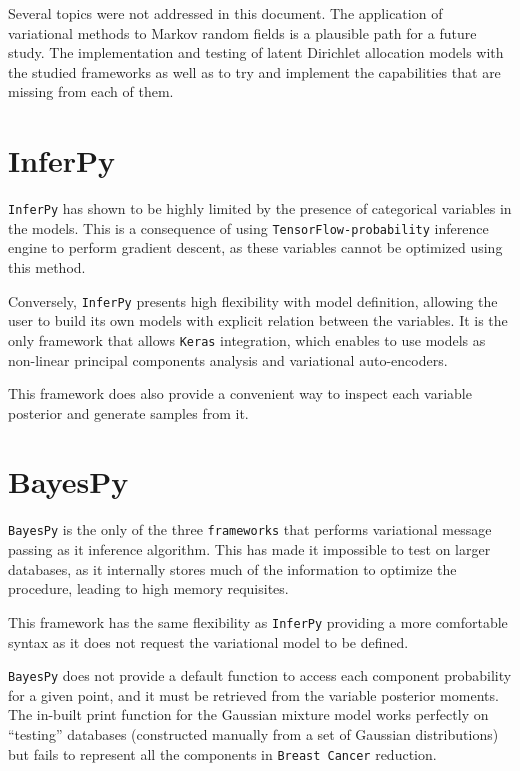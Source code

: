 Several topics were not addressed in this document. The application of variational methods to Markov random fields is a plausible path for a future study. The implementation and testing of latent Dirichlet allocation models with the studied frameworks as well as to try and implement the capabilities that are missing from each of them.

\section*{InferPy}
\texttt{InferPy} has shown to be highly limited by the presence of categorical variables in the models. This is a consequence of using \texttt{TensorFlow-probability} inference engine to perform gradient descent, as these variables cannot be optimized using this method.

Conversely, \texttt{InferPy} presents high flexibility with model definition, allowing the user to build its own models with explicit relation between the variables. It is the only framework that allows \texttt{Keras} integration, which enables to use models as non-linear principal components analysis and variational auto-encoders.

This framework does also provide a convenient way to inspect each variable posterior and generate samples from it.


\section*{BayesPy}

\texttt{BayesPy} is the only of the three \texttt{frameworks} that performs variational message passing as it inference algorithm. This has made it impossible to test on larger databases, as it internally stores much of the information to optimize the procedure, leading to high memory requisites.

This framework has the same flexibility as \texttt{InferPy} providing a more comfortable syntax as it does not request the variational model to be defined.

\texttt{BayesPy} does not provide a default function to access each component probability for a given point, and it must be retrieved from the variable posterior moments. The in-built print function for the Gaussian mixture model works perfectly on ``testing'' databases (constructed manually from a set of Gaussian distributions) but fails to represent all the components in \texttt{Breast Cancer} reduction.

